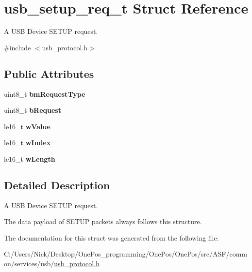 \hypertarget{structusb__setup__req__t}{\section{usb\-\_\-setup\-\_\-req\-\_\-t Struct Reference}
\label{structusb__setup__req__t}
}


A U\-S\-B Device S\-E\-T\-U\-P request.  




{\ttfamily \#include $<$usb\-\_\-protocol.\-h$>$}

\subsection*{Public Attributes}
\begin{DoxyCompactItemize}
\item 
\hypertarget{structusb__setup__req__t_a4d0bc5061aba087bd50d83c5a120b833}{uint8\-\_\-t {\bfseries bm\-Request\-Type}}\label{structusb__setup__req__t_a4d0bc5061aba087bd50d83c5a120b833}

\item 
\hypertarget{structusb__setup__req__t_ac88656bbea11e32e0be42cd178eba600}{uint8\-\_\-t {\bfseries b\-Request}}\label{structusb__setup__req__t_ac88656bbea11e32e0be42cd178eba600}

\item 
\hypertarget{structusb__setup__req__t_ab5516d82c87a1334e7ca6fa3bb418faa}{le16\-\_\-t {\bfseries w\-Value}}\label{structusb__setup__req__t_ab5516d82c87a1334e7ca6fa3bb418faa}

\item 
\hypertarget{structusb__setup__req__t_ae6ca45a24d06a2ccef7a06b71d1b1699}{le16\-\_\-t {\bfseries w\-Index}}\label{structusb__setup__req__t_ae6ca45a24d06a2ccef7a06b71d1b1699}

\item 
\hypertarget{structusb__setup__req__t_a2e8a9bbc9ed2e64335345338a5b4ce1e}{le16\-\_\-t {\bfseries w\-Length}}\label{structusb__setup__req__t_a2e8a9bbc9ed2e64335345338a5b4ce1e}

\end{DoxyCompactItemize}


\subsection{Detailed Description}
A U\-S\-B Device S\-E\-T\-U\-P request. 

The data payload of S\-E\-T\-U\-P packets always follows this structure. 

The documentation for this struct was generated from the following file\-:\begin{DoxyCompactItemize}
\item 
C\-:/\-Users/\-Nick/\-Desktop/\-One\-Pos\-\_\-programming/\-One\-Pos/\-One\-Pos/src/\-A\-S\-F/common/services/usb/\hyperlink{usb__protocol_8h}{usb\-\_\-protocol.\-h}\end{DoxyCompactItemize}
